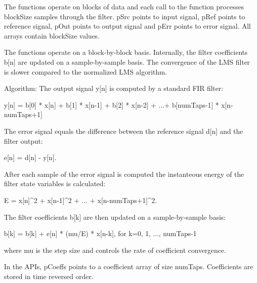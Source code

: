 The functions operate on blocks of data and each call to the function processes {\ttfamily block\-Size} samples through the filter. {\ttfamily p\-Src} points to input signal, {\ttfamily p\-Ref} points to reference signal, {\ttfamily p\-Out} points to output signal and {\ttfamily p\-Err} points to error signal. All arrays contain {\ttfamily block\-Size} values.

The functions operate on a block-\/by-\/block basis. Internally, the filter coefficients {\ttfamily b\mbox{[}n\mbox{]}} are updated on a sample-\/by-\/sample basis. The convergence of the L\-M\-S filter is slower compared to the normalized L\-M\-S algorithm.

\begin{DoxyParagraph}{Algorithm\-: }
The output signal {\ttfamily y\mbox{[}n\mbox{]}} is computed by a standard F\-I\-R filter\-: 
\begin{DoxyPre}    
     y[n] = b[0] * x[n] + b[1] * x[n-1] + b[2] * x[n-2] + ...+ b[numTaps-1] * x[n-numTaps+1]    
 \end{DoxyPre}

\end{DoxyParagraph}
\begin{DoxyParagraph}{}
The error signal equals the difference between the reference signal {\ttfamily d\mbox{[}n\mbox{]}} and the filter output\-: 
\begin{DoxyPre}    
     e[n] = d[n] - y[n].    
 \end{DoxyPre}

\end{DoxyParagraph}
\begin{DoxyParagraph}{}
After each sample of the error signal is computed the instanteous energy of the filter state variables is calculated\-: 
\begin{DoxyPre}    
    E = x[n]^2 + x[n-1]^2 + ... + x[n-numTaps+1]^2.    
 \end{DoxyPre}
 The filter coefficients {\ttfamily b\mbox{[}k\mbox{]}} are then updated on a sample-\/by-\/sample basis\-: 
\begin{DoxyPre}    
     b[k] = b[k] + e[n] * (mu/E) * x[n-k],  for k=0, 1, ..., numTaps-1    
 \end{DoxyPre}
 where {\ttfamily mu} is the step size and controls the rate of coefficient convergence. 
\end{DoxyParagraph}
\begin{DoxyParagraph}{}
In the A\-P\-Is, {\ttfamily p\-Coeffs} points to a coefficient array of size {\ttfamily num\-Taps}. Coefficients are stored in time reversed order. 
\end{DoxyParagraph}

